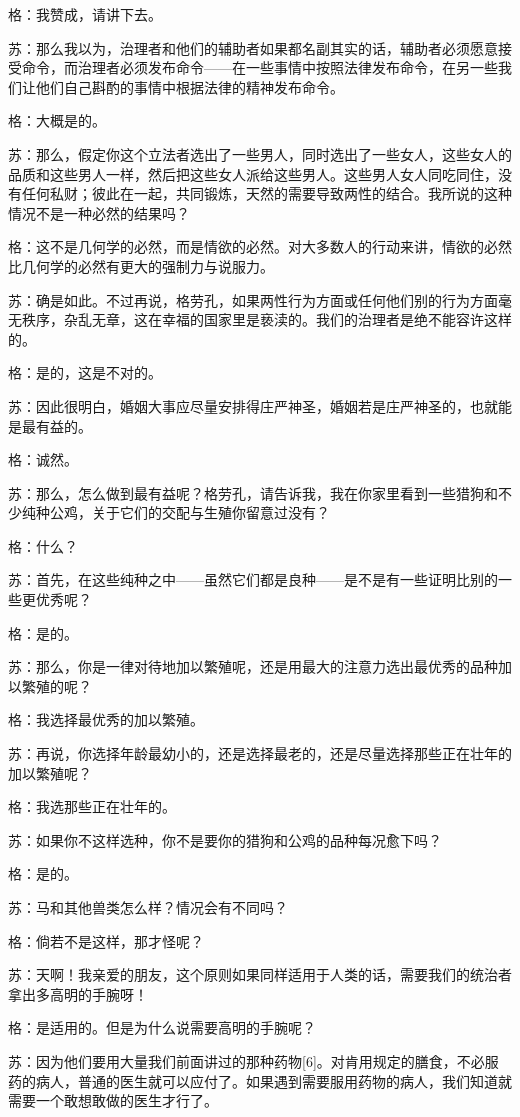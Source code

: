 \documentclass[12pt,oneside]{book}
\begin{document}
格：我赞成，请讲下去。

苏：那么我以为，治理者和他们的辅助者如果都名副其实的话，辅助者必须愿意接受命令，而治理者必须发布命令——在一些事情中按照法律发布命令，在另一些我们让他们自己斟酌的事情中根据法律的精神发布命令。

格：大概是的。

苏：那么，假定你这个立法者选出了一些男人，同时选出了一些女人，这些女人的品质和这些男人一样，然后把这些女人派给这些男人。这些男人女人同吃同住，没有任何私财；彼此在一起，共同锻炼，天然的需要导致两性的结合。我所说的这种情况不是一种必然的结果吗？

格：这不是几何学的必然，而是情欲的必然。对大多数人的行动来讲，情欲的必然比几何学的必然有更大的强制力与说服力。

苏：确是如此。不过再说，格劳孔，如果两性行为方面或任何他们别的行为方面毫无秩序，杂乱无章，这在幸福的国家里是亵渎的。我们的治理者是绝不能容许这样的。

格：是的，这是不对的。

苏：因此很明白，婚姻大事应尽量安排得庄严神圣，婚姻若是庄严神圣的，也就能是最有益的。

格：诚然。

苏：那么，怎么做到最有益呢？格劳孔，请告诉我，我在你家里看到一些猎狗和不少纯种公鸡，关于它们的交配与生殖你留意过没有？

格：什么？

苏：首先，在这些纯种之中——虽然它们都是良种——是不是有一些证明比别的一些更优秀呢？

格：是的。

苏：那么，你是一律对待地加以繁殖呢，还是用最大的注意力选出最优秀的品种加以繁殖的呢？

格：我选择最优秀的加以繁殖。

苏：再说，你选择年龄最幼小的，还是选择最老的，还是尽量选择那些正在壮年的加以繁殖呢？

格：我选那些正在壮年的。

苏：如果你不这样选种，你不是要你的猎狗和公鸡的品种每况愈下吗？

格：是的。

苏：马和其他兽类怎么样？情况会有不同吗？

格：倘若不是这样，那才怪呢？

苏：天啊！我亲爱的朋友，这个原则如果同样适用于人类的话，需要我们的统治者拿出多高明的手腕呀！

格：是适用的。但是为什么说需要高明的手腕呢？

苏：因为他们要用大量我们前面讲过的那种药物[6]。对肯用规定的膳食，不必服药的病人，普通的医生就可以应付了。如果遇到需要服用药物的病人，我们知道就需要一个敢想敢做的医生才行了。
\end{document}
